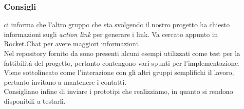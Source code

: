 \subsubsection{Consigli}
\Proponente{} ci informa che l'altro gruppo che sta svolgendo il nostro progetto ha chiesto informazioni sugli \textit{action link} per generare i link. Va cercato appunto  in Rocket.Chat per avere maggiori informazioni.\\
Nel repository fornito da \Proponente{} sono presenti alcuni esempi utilizzati come test per la fattibilità del progetto, pertanto contengono vari spunti per l'implementazione.\\
Viene sottolineato come l'interazione con gli altri gruppi semplifichi il lavoro, pertanto invitano a mantenere i contatti.\\
Consigliano infine di inviare i prototipi che realizziamo, in quanto si rendono disponibili a testarli.
\clearpage
